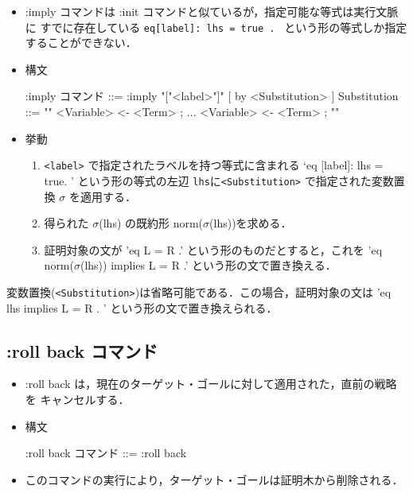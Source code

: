 \documentclass[a4paper,oneside,10pt,here]{memoir}
\newenvironment{vvtm}%
{\parskip=0pt\lineskip=0pt\begin{center}\begin{minipage}{0.8\textwidth}\begin{snugshade}}%
  {\end{snugshade}\end{minipage}\end{center}}
\begin{document}
\begin{itemize}
\item :imply コマンドは :init コマンドと似ているが，指定可能な等式は実行文脈に
  すでに存在している \verb|eq[label]: lhs = true . | という形の等式しか指定することができない．
\item 構文
  \begin{vvtm}
    \begin{simplev}
 :imply コマンド ::= :imply "["<label>"]" [ by <Substitution> ]
 Substitution   ::= "{" <Variable> <- <Term> ; ... <Variable> <- <Term> ; "}"
    \end{simplev}
  \end{vvtm}
  \item 挙動\\
    \begin{enumerate}
      \item \verb|<label>| で指定されたラベルを持つ等式に含まれる `eq [label]: lhs = true. ' 
        という形の等式の左辺 \verb|lhs|に\verb|<Substitution>| で指定された変数置換 $\sigma$ 
        を適用する．
      \item 得られた $\sigma$(lhs) の既約形 norm($\sigma$(lhs))を求める．
      \item 証明対象の文が 'eq L = R .' という形のものだとすると，これを
        'eq norm($\sigma$(lhs)) implies L = R .' という形の文で置き換える．
      \end{enumerate}
\end{itemize}
変数置換(\verb|<Substitution>|)は省略可能である．この場合，証明対象の文は
'eq lhs implies L = R . ' という形の文で置き換えられる．

\subsection{:roll back コマンド}

\begin{itemize}
\item :roll back は，現在のターゲット・ゴールに対して適用された，直前の戦略を
  キャンセルする．
\item 構文
  \begin{vvtm}
    \begin{simplev}
      :roll back コマンド ::= :roll back
    \end{simplev}
  \end{vvtm}
\item このコマンドの実行により，ターゲット・ゴールは証明木から削除される．
\end{itemize}
\end{document}
